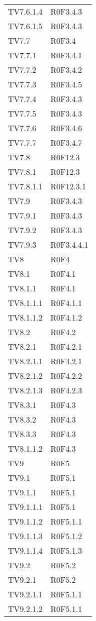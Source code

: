 \documentclass[PianoDiQualifica.tex]{subfiles}
\begin{document}
\begin{longtable}[H]{P{6.5cm}P{7cm}}
	TV7.6.1.4 & R0F3.4.3 \\ 
	TV7.6.1.5 & R0F3.4.3 \\ 
	TV7.7 & R0F3.4 \\ 
	TV7.7.1 & R0F3.4.1 \\ 
	TV7.7.2 & R0F3.4.2 \\ 
	TV7.7.3 & R0F3.4.5 \\ 
	TV7.7.4 & R0F3.4.3 \\ 
	TV7.7.5 & R0F3.4.3 \\ 
	TV7.7.6 & R0F3.4.6 \\ 
	TV7.7.7 & R0F3.4.7 \\ 
	TV7.8 & R0F12.3 \\ 
	TV7.8.1 & R0F12.3 \\ 
	TV7.8.1.1 & R0F12.3.1 \\
	TV7.9 & R0F3.4.3\\ 
	TV7.9.1 & R0F3.4.3 \\ 
	TV7.9.2 & R0F3.4.3 \\ 
	TV7.9.3 & R0F3.4.4.1 \\ 
	TV8 & R0F4 \\ 
	TV8.1 & R0F4.1 \\ 
	TV8.1.1 & R0F4.1 \\ 
	TV8.1.1.1 & R0F4.1.1 \\ 
	TV8.1.1.2 & R0F4.1.2\\
	TV8.2 & R0F4.2 \\
	TV8.2.1 & R0F4.2.1 \\
	TV8.2.1.1 & R0F4.2.1 \\
	TV8.2.1.2 & R0F4.2.2 \\
	TV8.2.1.3 &  R0F4.2.3\\
	TV8.3.1 & R0F4.3 \\
	TV8.3.2 & R0F4.3 \\
	TV8.3.3 & R0F4.3 \\
	TV8.1.1.2 & R0F4.3 \\
	TV9 & R0F5 \\
	TV9.1 & R0F5.1 \\
	TV9.1.1 & R0F5.1 \\
	TV9.1.1.1 & R0F5.1 \\
	TV9.1.1.2 & R0F5.1.1 \\
	TV9.1.1.3 & R0F5.1.2 \\
	TV9.1.1.4 & R0F5.1.3 \\
	TV9.2 & R0F5.2 \\
	TV9.2.1 & R0F5.2 \\
	TV9.2.1.1 & R0F5.1.1 \\
	TV9.2.1.2 & R0F5.1.1 \\

\end{longtable}
\end{document}
